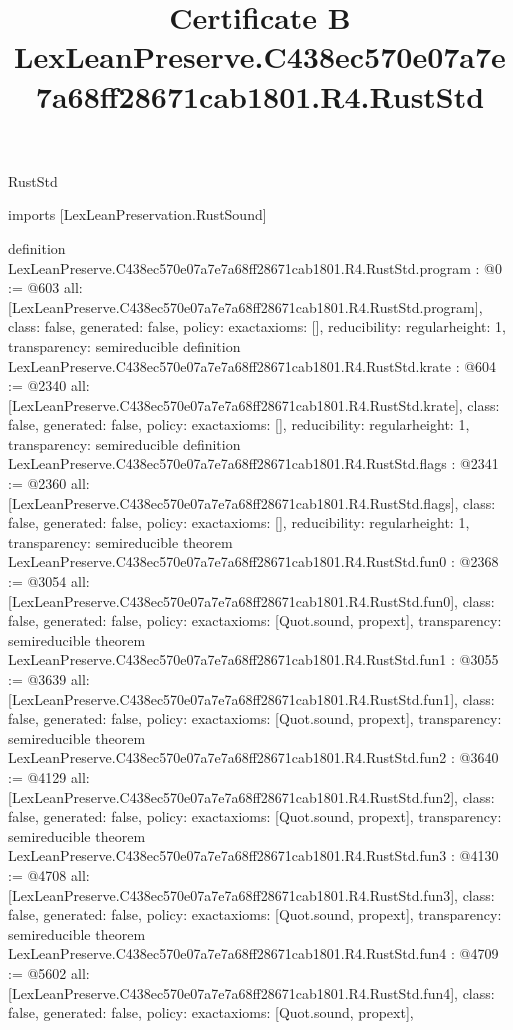 \begin{lexlean}{RustStd}
\title{Certificate B LexLeanPreserve.C438ec570e07a7e7a68ff28671cab1801.R4.RustStd}
\begin{coremodule}
imports [LexLeanPreservation.RustSound]

definition LexLeanPreserve.C438ec570e07a7e7a68ff28671cab1801.R4.RustStd.program : @0 := @603 {
  all: [LexLeanPreserve.C438ec570e07a7e7a68ff28671cab1801.R4.RustStd.program],
  class: false,
  generated: false,
  policy: exact{axioms: []},
  reducibility: regular{height: 1},
  transparency: semireducible
}
definition LexLeanPreserve.C438ec570e07a7e7a68ff28671cab1801.R4.RustStd.krate : @604 := @2340 {
  all: [LexLeanPreserve.C438ec570e07a7e7a68ff28671cab1801.R4.RustStd.krate],
  class: false,
  generated: false,
  policy: exact{axioms: []},
  reducibility: regular{height: 1},
  transparency: semireducible
}
definition LexLeanPreserve.C438ec570e07a7e7a68ff28671cab1801.R4.RustStd.flags : @2341 := @2360 {
  all: [LexLeanPreserve.C438ec570e07a7e7a68ff28671cab1801.R4.RustStd.flags],
  class: false,
  generated: false,
  policy: exact{axioms: []},
  reducibility: regular{height: 1},
  transparency: semireducible
}
theorem LexLeanPreserve.C438ec570e07a7e7a68ff28671cab1801.R4.RustStd.fun0 : @2368 := @3054 {
  all: [LexLeanPreserve.C438ec570e07a7e7a68ff28671cab1801.R4.RustStd.fun0],
  class: false,
  generated: false,
  policy: exact{axioms: [Quot.sound, propext]},
  transparency: semireducible
}
theorem LexLeanPreserve.C438ec570e07a7e7a68ff28671cab1801.R4.RustStd.fun1 : @3055 := @3639 {
  all: [LexLeanPreserve.C438ec570e07a7e7a68ff28671cab1801.R4.RustStd.fun1],
  class: false,
  generated: false,
  policy: exact{axioms: [Quot.sound, propext]},
  transparency: semireducible
}
theorem LexLeanPreserve.C438ec570e07a7e7a68ff28671cab1801.R4.RustStd.fun2 : @3640 := @4129 {
  all: [LexLeanPreserve.C438ec570e07a7e7a68ff28671cab1801.R4.RustStd.fun2],
  class: false,
  generated: false,
  policy: exact{axioms: [Quot.sound, propext]},
  transparency: semireducible
}
theorem LexLeanPreserve.C438ec570e07a7e7a68ff28671cab1801.R4.RustStd.fun3 : @4130 := @4708 {
  all: [LexLeanPreserve.C438ec570e07a7e7a68ff28671cab1801.R4.RustStd.fun3],
  class: false,
  generated: false,
  policy: exact{axioms: [Quot.sound, propext]},
  transparency: semireducible
}
theorem LexLeanPreserve.C438ec570e07a7e7a68ff28671cab1801.R4.RustStd.fun4 : @4709 := @5602 {
  all: [LexLeanPreserve.C438ec570e07a7e7a68ff28671cab1801.R4.RustStd.fun4],
  class: false,
  generated: false,
  policy: exact{axioms: [Quot.sound, propext]},
}
\end{coremodule}
\end{lexlean}
